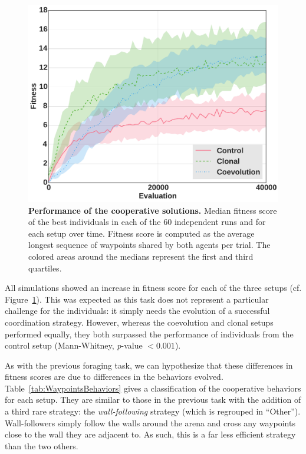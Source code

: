     \begin{figure}[h]
      \begin{center}
        \includegraphics[scale = 0.4]{fig/ArticleRob1/fitnessWaypoints.pdf}
        \caption{\textbf{Performance of the cooperative solutions.}
        Median fitness score of the best individuals in each of the 60 independent runs and for each setup over time. Fitness score is computed as the average longest sequence of waypoints shared by both agents per trial. The colored areas around the medians represent the first and third quartiles.}
        \label{fig:WaypointsFitness}
      \end{center}
    \end{figure}

    All simulations showed an increase in fitness score for each of the three setups (cf. Figure~\ref{fig:WaypointsFitness}). This was expected as this task does not represent a particular challenge for the individuals: it simply needs the evolution of a successful coordination strategy. However, whereas the coevolution and clonal setups performed equally, they both surpassed the performance of individuals from the control setup (Mann-Whitney, {\em p}-value $< 0.001$).

    As with the previous foraging task, we can hypothesize that these differences in fitness scores are due to differences in the behaviors evolved. Table~\ref{tab:WaypointsBehaviors} gives a classification of the cooperative behaviors for each setup. They are similar to those in the previous task with the addition of a third rare strategy: the \emph{wall-following} strategy (which is regrouped in ``Other''). Wall-followers simply follow the walls around the arena and cross any waypoints close to the wall they are adjacent to. As such, this is a far less efficient strategy than the two others. 


